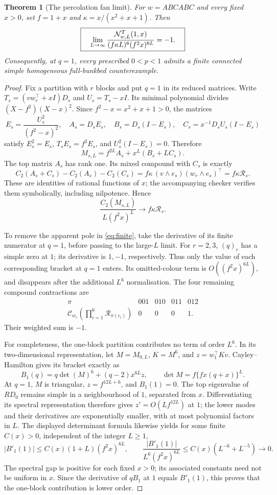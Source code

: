 \documentclass[11pt,a4paper]{article}
\newtheorem{theorem}{Theorem}[section]
\theoremstyle{remark}\newtheorem{remark}[theorem]{Remark}
\newcommand{\R}{\mathcal R}\newcommand{\CC}{\mathcal C}
\begin{document}
\begin{theorem}[The percolation fan limit]\label{thm:qone}
For $w=ABCABC$ and every fixed $x>0$, set $f=1+x$ and $\kappa=x/(x^2+x+1)$. Then
\begin{equation}\label{eq:qonelimit}
\boxed{\quad
\lim_{L\to\infty}
\frac{\mathcal N^T_{w,L}(1,x)}{(f\kappa L)^6(f^2x)^{6L}}=-1.
\quad}
\end{equation}
Consequently, at $q=1$, every prescribed $0<p<1$ admits a finite connected simple homogeneous full-bunkbed counterexample.
\end{theorem}
\begin{proof}
Fix a partition with $r$ blocks and put $q=1$ in its reduced matrices. Write
$T_s=(vw_r^\top+xI)D_s$ and $U_s=T_s-xI$. Its minimal polynomial divides
$(X-f^2)(X-x)^2$. Since $f^2-x=x^2+x+1>0$, the matrices
\[
E_s=\frac{U_s^2}{(f^2-x)^2},\quad
A_s=D_sE_s,\quad B_s=D_s(I-E_s),\quad
C_s=x^{-1}D_sU_s(I-E_s)
\]
satisfy $E_s^2=E_s$, $T_sE_s=f^2E_s$, and $U_s^2(I-E_s)=0$. Therefore
\[
M_{s,L}=f^{2L}A_s+x^L(B_s+LC_s).
\]
The top matrix $A_s$ has rank one. Its mixed compound with $C_s$ is exactly
\[
C_2(A_s+C_s)-C_2(A_s)-C_2(C_s)
=f\kappa\,(v\wedge e_s)(w_r\wedge e_s)^\top
=f\kappa\R_s.
\]
These are identities of rational functions of $x$; the accompanying checker verifies them symbolically, including nilpotence. Hence
\[
\frac{C_2(M_{s,L})}{L(f^2x)^L}\longrightarrow f\kappa\R_s.
\]

To remove the apparent pole in \eqref{eq:finite}, take the derivative of its finite numerator at $q=1$, before passing to the large-$L$ limit. For $r=2,3$, $(q)_r$ has a simple zero at $1$; its derivative is $1,-1$, respectively. Thus only the value of each corresponding bracket at $q=1$ enters. Its omitted-colour term is $O((f^2x)^{6L})$, and disappears after the additional $L^6$ normalisation. The four remaining compound contractions are
\[
\begin{array}{c|rrrr}
\pi&001&010&011&012\\\hline
\CC_{w_r}(\prod_{i=1}^6\R_{\pi(c_i)})&0&0&0&1.
\end{array}
\]
Their weighted sum is $-1$.

For completeness, the one-block partition contributes no term of order $L^6$. In its two-dimensional representation, let $M=M_{0,L}$, $K=M^6$, and $z=w_1^\top K v$. Cayley--Hamilton gives its bracket exactly as
\[
B_1(q)=q\det(M)^6+(q-2)x^{6L}z,
\qquad \det M=f\{fx(q+x)\}^{L}.
\]
At $q=1$, $M$ is triangular, $z=f^{12L+6}$, and $B_1(1)=0$. The top eigenvalue of $RD_0$ remains simple in a neighbourhood of $1$, separated from $x$. Differentiating its spectral representation therefore gives $z'=O(Lf^{12L})$ at $1$; the lower modes and their derivatives are exponentially smaller, with at most polynomial factors in $L$. The displayed determinant formula likewise yields
for some finite $C(x)>0$, independent of the integer $L\ge1$,
\[
|B'_1(1)|\le C(x)(1+L)(f^2x)^{6L},\qquad
\frac{|B'_1(1)|}{L^6(f^2x)^{6L}}
\le C(x)(L^{-6}+L^{-5})\longrightarrow0.
\]
The spectral gap is positive for each fixed $x>0$; its associated constants need not be uniform in $x$. Since the derivative of $qB_1$ at $1$ equals $B'_1(1)$, this proves that the one-block contribution is lower order.


\end{proof}
\end{document}
